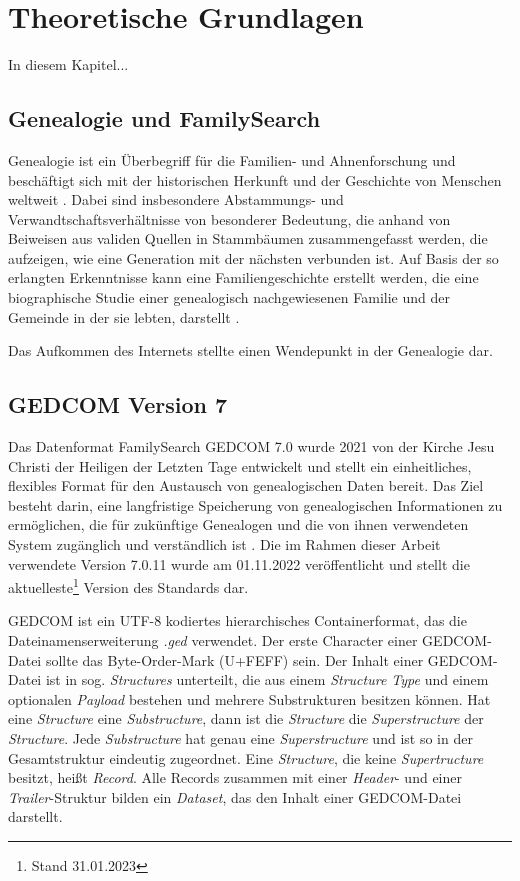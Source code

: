 \chapter{Theoretische Grundlagen}
\label{chap: Theoretische Grundlagen}
In diesem Kapitel...

\section{Genealogie und FamilySearch}
\label{sec: Genealogie und FamilySearch}
Genealogie ist ein Überbegriff für die Familien- und Ahnenforschung und beschäftigt sich mit der historischen Herkunft und der Geschichte von Menschen weltweit \cite{AhnenforschungDE}. Dabei sind insbesondere Abstammungs- und Verwandtschaftsverhältnisse von besonderer Bedeutung, die anhand von Beiweisen aus validen Quellen in Stammbäumen zusammengefasst werden, die aufzeigen, wie eine Generation mit der nächsten verbunden ist. Auf Basis der so erlangten Erkenntnisse kann eine Familiengeschichte erstellt werden, die eine biographische Studie einer genealogisch nachgewiesenen Familie und der Gemeinde in der sie lebten, darstellt \cite{SocietyOfGenealogists}.

Das Aufkommen des Internets stellte einen Wendepunkt in der Genealogie dar. 

\section{GEDCOM Version 7}
\label{sec: GEDCOM Version 7}
Das Datenformat FamilySearch GEDCOM 7.0 wurde 2021 von der Kirche Jesu Christi der Heiligen der Letzten Tage entwickelt und stellt ein einheitliches, flexibles Format für den Austausch von genealogischen Daten bereit. Das Ziel besteht darin, eine langfristige Speicherung von genealogischen Informationen zu ermöglichen, die für zukünftige Genealogen und die von ihnen verwendeten System zugänglich und verständlich ist \cite{GEDCOM}. Die im Rahmen dieser Arbeit verwendete Version 7.0.11 wurde am 01.11.2022 veröffentlicht und stellt die aktuelleste\footnote{Stand 31.01.2023} Version des Standards dar. 

GEDCOM ist ein UTF-8 kodiertes hierarchisches Containerformat, das die Dateinamenserweiterung \textit{.ged} verwendet. Der erste Character einer GEDCOM-Datei sollte das Byte-Order-Mark (U+FEFF) sein. Der Inhalt einer GEDCOM-Datei ist in sog. \textit{Structures} unterteilt, die aus einem \textit{Structure Type} und einem optionalen \textit{Payload} bestehen und mehrere Substrukturen besitzen können. Hat eine \textit{Structure} eine \textit{Substructure}, dann ist die \textit{Structure} die \textit{Superstructure} der \textit{Structure}. Jede \textit{Substructure} hat genau eine \textit{Superstructure} und ist so in der Gesamtstruktur eindeutig zugeordnet. Eine \textit{Structure}, die keine \textit{Supertructure} besitzt, heißt \textit{Record}. Alle Records zusammen mit einer \textit{Header}- und einer \textit{Trailer}-Struktur bilden ein \textit{Dataset}, das den Inhalt einer GEDCOM-Datei darstellt. \cite{GEDCOM} 

